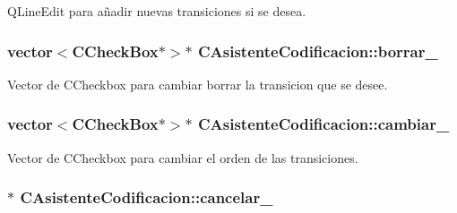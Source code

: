 Q\+Line\+Edit para añadir nuevas transiciones si se desea. 

\subsubsection[{\texorpdfstring{borrar\+\_\+}{borrar_}}]{\setlength{\rightskip}{0pt plus 5cm}vector$<${\bf C\+Check\+Box}$\ast$$>$$\ast$ C\+Asistente\+Codificacion\+::borrar\+\_\+\hspace{0.3cm}{\ttfamily [private]}}\hypertarget{classCAsistenteCodificacion_a6cc0224f0b309b0b997b0178ab7e69e6}{}\label{classCAsistenteCodificacion_a6cc0224f0b309b0b997b0178ab7e69e6}


Vector de C\+Checkbox para cambiar borrar la transicion que se desee. 

\subsubsection[{\texorpdfstring{cambiar\+\_\+}{cambiar_}}]{\setlength{\rightskip}{0pt plus 5cm}vector$<${\bf C\+Check\+Box}$\ast$$>$$\ast$ C\+Asistente\+Codificacion\+::cambiar\+\_\+\hspace{0.3cm}{\ttfamily [private]}}\hypertarget{classCAsistenteCodificacion_a7c50f4349d8de445b66d49a1a34df74a}{}\label{classCAsistenteCodificacion_a7c50f4349d8de445b66d49a1a34df74a}


Vector de C\+Checkbox para cambiar el orden de las transiciones. 

\subsubsection[{\texorpdfstring{cancelar\+\_\+}{cancelar_}}]{$\ast$ C\+Asistente\+Codificacion\+::cancelar\+\_\+\hspace{0.3cm}{\ttfamily [private]}}\hypertarget{classCAsistenteCodificacion_a38cc5ae5adde6fa070e0ce0974de7778}{}\label{classCAsistenteCodificacion_a38cc5ae5adde6fa070e0ce0974de7778}


